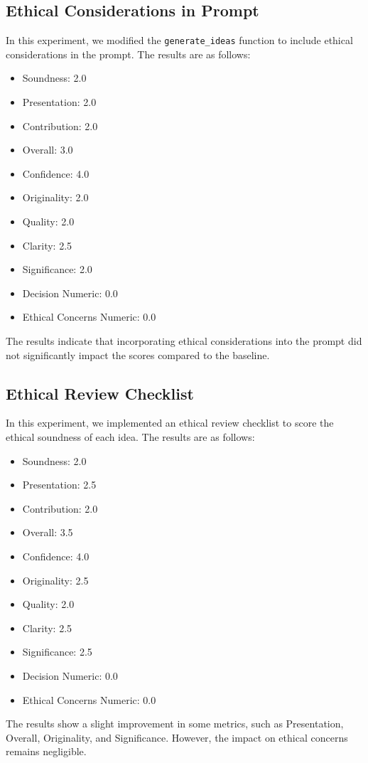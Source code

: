 \documentclass{article} %
\begin{document}
\subsection{Ethical Considerations in Prompt}
In this experiment, we modified the \texttt{generate\_ideas} function to include ethical considerations in the prompt. The results are as follows:
\begin{itemize}
    \item Soundness: 2.0
    \item Presentation: 2.0
    \item Contribution: 2.0
    \item Overall: 3.0
    \item Confidence: 4.0
    \item Originality: 2.0
    \item Quality: 2.0
    \item Clarity: 2.5
    \item Significance: 2.0
    \item Decision Numeric: 0.0
    \item Ethical Concerns Numeric: 0.0
\end{itemize}
The results indicate that incorporating ethical considerations into the prompt did not significantly impact the scores compared to the baseline.

\subsection{Ethical Review Checklist}
In this experiment, we implemented an ethical review checklist to score the ethical soundness of each idea. The results are as follows:
\begin{itemize}
    \item Soundness: 2.0
    \item Presentation: 2.5
    \item Contribution: 2.0
    \item Overall: 3.5
    \item Confidence: 4.0
    \item Originality: 2.5
    \item Quality: 2.0
    \item Clarity: 2.5
    \item Significance: 2.5
    \item Decision Numeric: 0.0
    \item Ethical Concerns Numeric: 0.0
\end{itemize}
The results show a slight improvement in some metrics, such as Presentation, Overall, Originality, and Significance. However, the impact on ethical concerns remains negligible.
\end{document}
